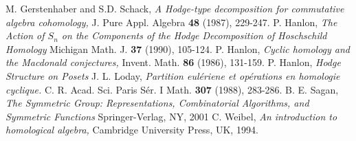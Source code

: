   M. Gerstenhaber and S.D. Schack,
  \emph{A Hodge-type decomposition for commutative algebra cohomology,}
  J. Pure Appl. Algebra {\bf 48} (1987), 229-247.
  P. Hanlon, 
  \emph{The Action of $S_n$ on the Components of the Hodge Decomposition of Hoschschild Homology}
  Michigan Math. J. {\bf 37} (1990), 105-124.
  P. Hanlon,
  \emph{Cyclic homology and the Macdonald conjectures,}
  Invent. Math. {\bf 86} (1986), 131-159.
  P. Hanlon,
  \emph{Hodge Structure on Posets}
  J. L. Loday,
  \emph{Partition eul\'eriene et op\'erations en homologie cyclique.}
  C. R. Acad. Sci. Paris S\'er. I Math. {\bf 307} (1988), 283-286.
  B. E. Sagan,
  \emph{The Symmetric Group: Representations, Combinatorial Algorithms, and Symmetric Functions}
  Springer-Verlag, NY, 2001
  C. Weibel,
  \emph{An introduction to homological algebra,}
  Cambridge University Press, UK, 1994.